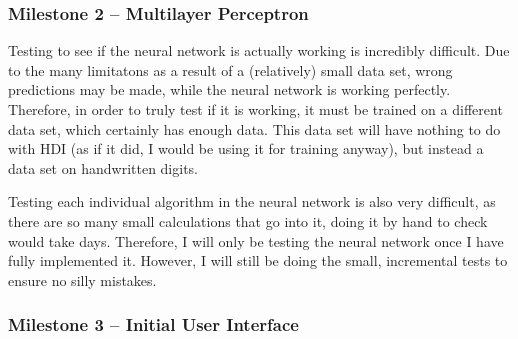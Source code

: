 \documentclass[12pt]{report}
\begin{document}
\subsubsection{Milestone 2 -- Multilayer Perceptron}
Testing to see if the neural network is actually working is incredibly difficult. Due to the many limitatons as a result of a (relatively) small data set, wrong predictions may be made, while the neural network is working perfectly. Therefore, in order to truly test if it is working, it must be trained on a different data set, which certainly has enough data. This data set will have nothing to do with HDI (as if it did, I would be using it for training anyway), but instead a data set on handwritten digits.

Testing each individual algorithm in the neural network is also very difficult, as there are so many small calculations that go into it, doing it by hand to check would take days. Therefore, I will only be testing the neural network once I have fully implemented it. However, I will still be doing the small, incremental tests to ensure no silly mistakes.
\begin{center}
\end{center}

\subsubsection{Milestone 3 -- Initial User Interface}
\begin{center}
\end{center}
\end{document}
